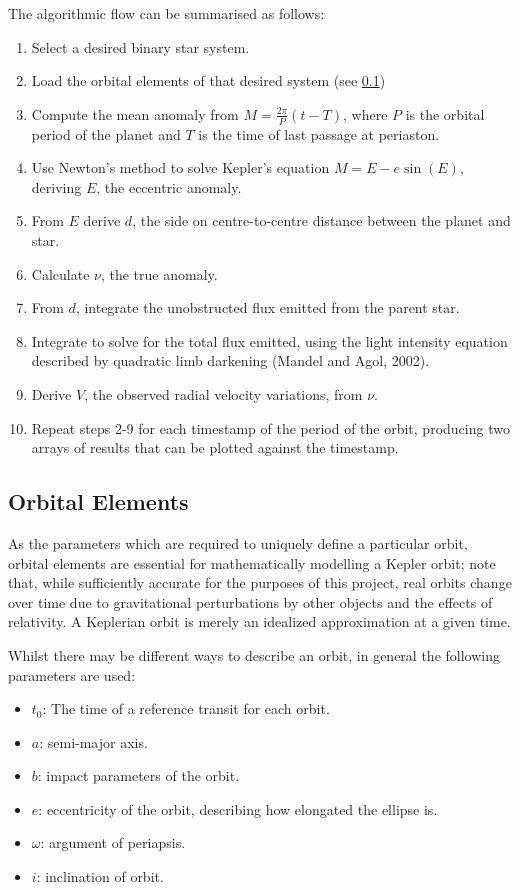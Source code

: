 \documentclass[11pt]{article}
\begin{document}
The algorithmic flow can be summarised as follows: 
\begin{enumerate}
	\item Select a desired binary star system.
	\item Load the orbital elements of that desired system (see \ref{orbital-elements}) 
	\item Compute the mean anomaly from \(M = \frac{2\pi}{P}(t-T)\), where \(P\) is the orbital period of the planet and \(T\) is the time of last passage at periaston.
	\item Use Newton's method to solve Kepler's equation \(M =E - e\sin(E)\), deriving \(E\), the eccentric anomaly. 
	\item From \(E\) derive \(d\), the side on centre-to-centre distance between the planet and star. 
	\item Calculate \(\nu\), the true anomaly. 
	\item From \(d\), integrate the unobstructed flux emitted from the parent star. 
	\item Integrate to solve for the total flux emitted, using the light intensity equation described by quadratic limb darkening (Mandel and Agol, 2002). 
	\item Derive \(V\), the observed radial velocity variations, from \(\nu\). 
	\item Repeat steps 2-9 for each timestamp of the period of the orbit, producing two arrays of results that can be plotted against the	timestamp.
\end{enumerate}

    \hypertarget{orbital-elements}{%
\subsection{Orbital Elements}\label{orbital-elements}}

As the parameters which are required to uniquely define a particular
orbit, orbital elements are essential for mathematically modelling a
Kepler orbit; note that, while sufficiently accurate for the purposes of
this project, real orbits change over time due to gravitational
perturbations by other objects and the effects of relativity. A
Keplerian orbit is merely an idealized approximation at a given time.

Whilst there may be different ways to describe an orbit, in general the
following parameters are used: 

\begin{itemize}
	\item \(t_{0}\): The time of a reference transit for each orbit.
	\item \(a\): semi-major axis.
	\item \(b\): impact parameters of the orbit.
	\item \(e\): eccentricity of the orbit, describing how elongated the ellipse is.
	\item \(\omega\): argument of periapsis.
	\item \(i\): inclination of orbit.
\end{itemize}
\end{document}
